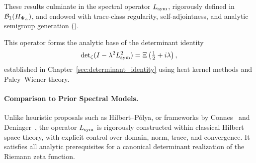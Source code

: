 These results culminate in the spectral operator \( L_{\mathrm{sym}} \), rigorously defined in \( \mathcal{B}_1(H_{\Psi_\alpha}) \), and endowed with trace-class regularity, self-adjointness, and analytic semigroup generation ().

\medskip

This operator forms the analytic base of the determinant identity
\[
\det\nolimits_{\zeta}(I - \lambda^2 L_{\mathrm{sym}}^2) = \Xi\left(\tfrac{1}{2} + i\lambda\right),
\]
established in Chapter~\ref{sec:determinant_identity} using heat kernel methods and Paley–Wiener theory.

\paragraph{Comparison to Prior Spectral Models.}
Unlike heuristic proposals such as Hilbert–Pólya, or frameworks by Connes~\cite{Connes1999TraceFormula} and Deninger~\cite{Deninger1998Frobenius}, the operator \( L_{\mathrm{sym}} \) is rigorously constructed within classical Hilbert space theory, with explicit control over domain, norm, trace, and convergence. It satisfies all analytic prerequisites for a canonical determinant realization of the Riemann zeta function.
